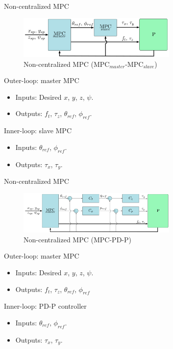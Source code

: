 \documentclass{thesisbeamer}
\newcommand\Fontvi{\fontsize{9}{10}\selectfont}
\begin{document}
\begin{frame}{Non-centralized MPC}
	\Fontvi

			\begin{figure}
				\includegraphics[width=0.7\textwidth]{Images/Control/non-centralized_mpc_1.png}
				\caption{Non-centralized MPC (MPC$_{master}$-MPC$_{slave}$)}
			\end{figure}

			Outer-loop: master MPC
			\begin{itemize}
				\item Inputs: Desired $x$, $y$, $z$, $\psi$.
				\item Outputs: $f_t$, $\tau_z$, $\theta_{ref}$, $\phi_{ref}$.
			\end{itemize}
			Inner-loop: slave MPC
			\begin{itemize}
				\item Inputs: $\theta_{ref}$, $\phi_{ref}$. 
				\item Outputs: $\tau_x$, $\tau_y$.
			\end{itemize}

\end{frame}

\begin{frame}{Non-centralized MPC}
	\Fontvi
	
			\begin{figure}
				\includegraphics[width=0.7\textwidth]{Images/Control/non-centralized_mpc_2.png}
				\caption{Non-centralized MPC (MPC-PD-P)}
			\end{figure}
			Outer-loop: master MPC
			\begin{itemize}
				\item Inputs: Desired $x$, $y$, $z$, $\psi$.
				\item Outputs: $f_t$, $\tau_z$, $\theta_{ref}$, $\phi_{ref}$ 
			\end{itemize}
			Inner-loop: PD-P controller
			\begin{itemize}
				\item Inputs: $\theta_{ref}$, $\phi_{ref}$. 
				\item Outputs: $\tau_x$, $\tau_y$.
			\end{itemize}
\end{frame}
\end{document}

